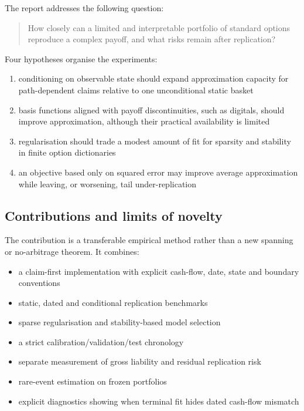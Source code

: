 \documentclass[12pt,a4paper]{article}
\newcommand{\1}{\mathbf{1}}
\begin{document}
The report addresses the following question:

\begin{quote}
How closely can a limited and interpretable portfolio of standard options reproduce a complex payoff, and what risks remain after replication?
\end{quote}

Four hypotheses organise the experiments:

\begin{enumerate}
\item conditioning on observable state should expand approximation capacity for path-dependent claims relative to one unconditional static basket
\item basis functions aligned with payoff discontinuities, such as digitals, should improve approximation, although their practical availability is limited
\item regularisation should trade a modest amount of fit for sparsity and stability in finite option dictionaries
\item an objective based only on squared error may improve average approximation while leaving, or worsening, tail under-replication
\end{enumerate}

\subsection{Contributions and limits of novelty}

The contribution is a transferable empirical method rather than a new spanning or no-arbitrage theorem. It combines:

\begin{itemize}
\item a claim-first implementation with explicit cash-flow, date, state and boundary conventions
\item static, dated and conditional replication benchmarks
\item sparse regularisation and stability-based model selection
\item a strict calibration/validation/test chronology
\item separate measurement of gross liability and residual replication risk
\item rare-event estimation on frozen portfolios
\item explicit diagnostics showing when terminal fit hides dated cash-flow mismatch
\end{itemize}
\end{document}
